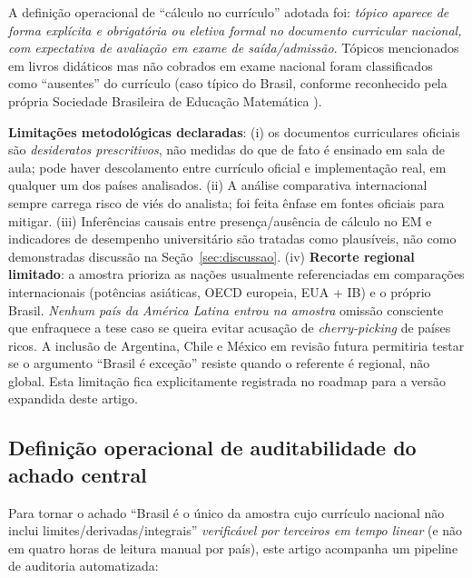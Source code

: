 \documentclass[12pt,a4paper,oneside]{article}
\begin{document}
A definição operacional de ``cálculo no currículo'' adotada foi:
\emph{tópico aparece de forma explícita e obrigatória ou eletiva
formal no documento curricular nacional, com expectativa de
avaliação em exame de saída/admissão}. Tópicos mencionados em
livros didáticos mas não cobrados em exame nacional foram
classificados como ``ausentes'' do currículo (caso típico do
Brasil, conforme reconhecido pela própria Sociedade Brasileira de
Educação Matemática \cite{ref:sbem-calculo}).

\textbf{Limitações metodológicas declaradas}: (i) os documentos
curriculares oficiais são \emph{desideratos prescritivos}, não
medidas do que de fato é ensinado em sala de aula; pode haver
descolamento entre currículo oficial e implementação real, em
qualquer um dos países analisados. (ii) A análise comparativa
internacional sempre carrega risco de viés do analista; foi feita
ênfase em fontes oficiais para mitigar. (iii) Inferências causais
entre presença/ausência de cálculo no EM e indicadores de
desempenho universitário são tratadas como plausíveis, não como
demonstradas \textemdash{} discussão na Seção~\ref{sec:discussao}.
(iv) \textbf{Recorte regional limitado}: a amostra prioriza as
nações usualmente referenciadas em comparações internacionais
(potências asiáticas, OECD europeia, EUA + IB) e o próprio Brasil.
\emph{Nenhum país da América Latina entrou na amostra}
\textemdash{} omissão consciente que enfraquece a tese caso se
queira evitar acusação de \emph{cherry-picking} de países ricos.
A inclusão de Argentina, Chile e México em revisão futura
permitiria testar se o argumento ``Brasil é exceção'' resiste
quando o referente é regional, não global. Esta limitação fica
explicitamente registrada no roadmap para a versão expandida
deste artigo.

\subsection*{Definição operacional de auditabilidade do achado central}

Para tornar o achado ``Brasil é o único da amostra cujo currículo
nacional não inclui limites/derivadas/integrais'' \emph{verificável
por terceiros em tempo linear} (e não em quatro horas de leitura
manual por país), este artigo acompanha um pipeline de
auditoria automatizada:
\end{document}
